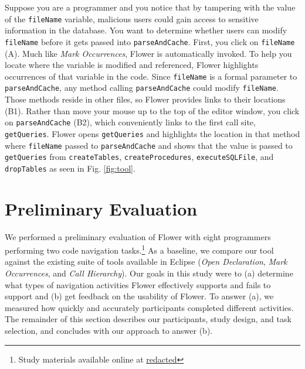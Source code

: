 \documentclass[conference]{IEEEtran}
\begin{document}
Suppose you are a programmer and you notice that by tampering with the value of the \texttt{fileName} variable, malicious users could gain access to sensitive information in the database. 
You want to determine whether users can modify \texttt{fileName} before it gets passed into \texttt{parseAndCache}. 
First, you click on \texttt{fileName} (A).
Much like \emph{Mark Occurrences}, Flower is automatically invoked.
To help you locate where the variable is modified and referenced, Flower highlights occurrences of that variable in the code.
Since \texttt{fileName} is a formal parameter to \texttt{parseAndCache}, any method calling \texttt{parseAndCache} could modify \texttt{fileName}. 
Those methods reside in other files, so Flower  provides links to their locations (B1).
Rather than move your mouse up to the top of the editor window, you click on \texttt{parseAndCache} (B2), which conveniently links to the first call site, \texttt{getQueries}. 
Flower  opens \texttt{getQueries} and highlights the location in that method where \texttt{fileName} passed to \texttt{parseAndCache} and shows that the value is passed to \texttt{getQueries} from \texttt{createTables}, \texttt{createProcedures}, \texttt{executeSQLFile}, and \texttt{dropTables} as seen in Fig. \ref{fig:tool}.  



\section{Preliminary Evaluation}
We performed a preliminary evaluation of Flower with eight programmers performing two code navigation tasks.\footnote{Study materials available online at 
	\url{redacted}}
As a baseline, we compare our tool against the existing suite of tools available in Eclipse (\emph{Open Declaration}, \emph{Mark Occurrences}, and \emph{Call Hierarchy}).
Our goals in this study were to (a) determine what types of navigation activities Flower  effectively supports and fails to support and (b) get feedback on the usability of Flower.
To answer (a), we measured how quickly and accurately participants completed different activities.
The remainder of this section describes our participants, study design, and task selection, and concludes with our approach to answer (b).
\end{document}
